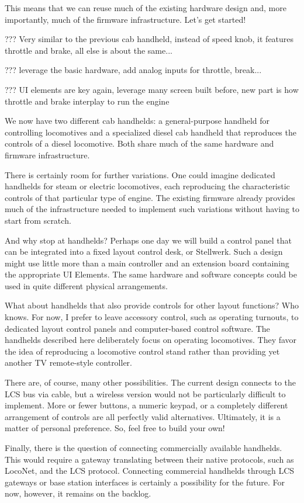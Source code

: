 This means that we can reuse much of the existing hardware design and, more importantly, much of the firmware infrastructure.
Let’s get started!


??? Very similar to the previous cab handheld, instead of speed knob, it features throttle and brake, all else is about the same...


??? leverage the basic hardware, add analog inputs for throttle, break...


??? UI elements are key again, leverage many screen built before, new part is how throttle and brake interplay to run the engine


We now have two different cab handhelds: a general-purpose handheld for controlling locomotives and a specialized diesel cab handheld that reproduces the controls of a diesel locomotive. Both share much of the same hardware and firmware infrastructure.

There is certainly room for further variations. One could imagine dedicated handhelds for steam or electric locomotives, each reproducing the characteristic controls of that particular type of engine. The existing firmware already provides much of the infrastructure needed to implement such variations without having to start from scratch.

And why stop at handhelds? Perhaps one day we will build a control panel that can be integrated into a fixed layout control desk, or Stellwerk. Such a design might use little more than a main controller and an extension board containing the appropriate UI Elements. The same hardware and software concepts could be used in quite different physical arrangements.

What about handhelds that also provide controls for other layout functions? Who knows. For now, I prefer to leave accessory control, such as operating turnouts, to dedicated layout control panels and computer-based control software. The handhelds described here deliberately focus on operating locomotives. They favor the idea of reproducing a locomotive control stand rather than providing yet another TV remote-style controller.

There are, of course, many other possibilities. The current design connects to the LCS bus via cable, but a wireless version would not be particularly difficult to implement. More or fewer buttons, a numeric keypad, or a completely different arrangement of controls are all perfectly valid alternatives. Ultimately, it is a matter of personal preference. So, feel free to build your own!

Finally, there is the question of connecting commercially available handhelds. This would require a gateway translating between their native protocols, such as LocoNet, and the LCS protocol. Connecting commercial handhelds through LCS gateways or base station interfaces is certainly a possibility for the future. For now, however, it remains on the backlog.